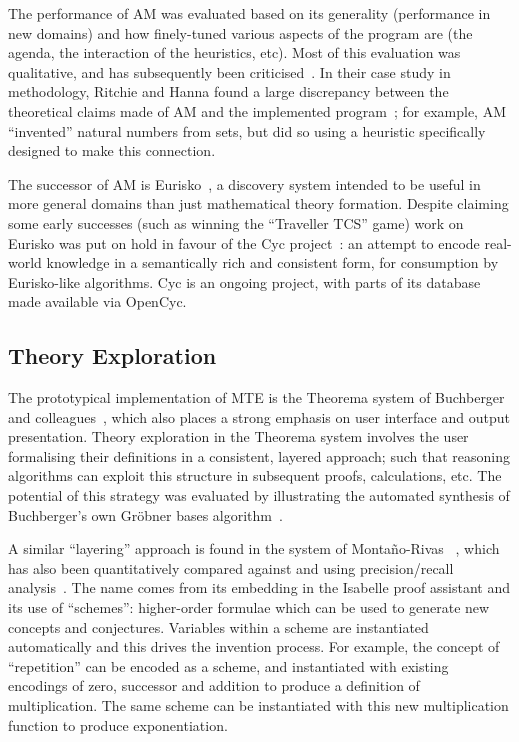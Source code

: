 The performance of AM was evaluated based on its generality (performance in new
domains) and how finely-tuned various aspects of the program are (the agenda,
the interaction of the heuristics, etc). Most of this evaluation was
qualitative, and has subsequently been criticised~\cite[chap.~13]{colton:book}.
In their case study in methodology, Ritchie and Hanna found a large discrepancy
between the theoretical claims made of AM and the implemented
program~\cite{ritchie1984case}; for example, AM ``invented'' natural numbers
from sets, but did so using a heuristic specifically designed to make this
connection.

The successor of AM is Eurisko~\cite{lenat83}, a discovery system intended to be
useful in more general domains than just mathematical theory formation. Despite
claiming some early successes (such as winning the ``Traveller TCS'' game) work
on Eurisko was put on hold in favour of the Cyc project~\cite{lenat1995cyc}: an
attempt to encode real-world knowledge in a semantically rich and consistent
form, for consumption by Eurisko-like algorithms. Cyc is an ongoing project,
with parts of its database made available via OpenCyc.

\subsection{Theory Exploration}

The prototypical implementation of MTE is the Theorema system of Buchberger and
colleagues~\cite{buchberger,buchberger2016theorema}, which also places a strong
emphasis on user interface and output presentation. Theory exploration in the
Theorema system involves the user formalising their definitions in a consistent,
layered approach; such that reasoning algorithms can exploit this structure in
subsequent proofs, calculations, etc. The potential of this strategy was
evaluated by illustrating the automated synthesis of Buchberger's own Gr\"obner
bases algorithm~\cite{buchberger:04}.

A similar ``layering'' approach is found in the \isascheme{} system of
Monta{\~n}o-Rivas \etal{}~\cite{Montano-Rivas.McCasland.Dixon.ea:2012}, which
has also been quantitatively compared against \isacosy{} and \hipspec{} using
precision/recall analysis~\cite{claessen2013automating}.
The name comes from its embedding in the Isabelle proof assistant and its use of
``schemes'': higher-order formulae which can be used to generate new concepts
and conjectures. Variables within a scheme are instantiated automatically and
this drives the invention process. For example, the concept of ``repetition''
can be encoded as a scheme, and instantiated with existing encodings of zero,
successor and addition to produce a definition of multiplication. The same
scheme can be instantiated with this new multiplication function to produce
exponentiation.

